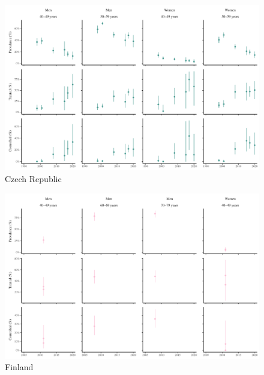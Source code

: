 \documentclass[12pt]{article}
\begin{document}
\begin{appendix}
\begin{refsection}
\begin{landscape}
        \begin{figure}[H]
            \centering
            \includegraphics[width=\linewidth]{../3_figures/countries/fig_czech republic.pdf}
            \caption{Czech Republic}
            \label{fig:czechia}
        \end{figure}

        \begin{figure}[H]
            \centering
            \includegraphics[width=\linewidth]{../3_figures/countries/fig_finland.pdf}
            \caption{Finland}
            \label{fig:finland}
        \end{figure}


\end{landscape}
\end{refsection}
\end{appendix}
\end{document}
